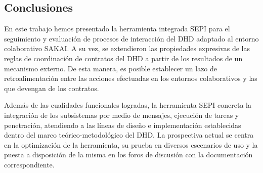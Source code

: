 \subsection{Conclusiones}


En este trabajo hemos presentado la herramienta integrada SEPI para el
seguimiento y evaluación de procesos de interacción del DHD adaptado al entorno
colaborativo SAKAI. A su vez, se extendieron las propiedades expresivas de las
reglas de coordinación de contratos del DHD a partir de los resultados de un
mecanismo externo. De esta manera, es posible establecer un lazo de
retroalimentación entre las acciones efectuadas en los entornos colaborativos y
las que devengan de los contratos.


Además de las cualidades funcionales logradas, la herramienta SEPI concreta la
integración de los subsistemas por medio de mensajes, ejecución de tareas y
penetración, atendiendo a las líneas de diseño e implementación establecidas
dentro del marco teórico-metodológico del DHD.
La prospectiva actual se centra en la optimización de la herramienta, su prueba
en diversos escenarios de uso y la puesta a disposición de la misma en los foros
de discusión con la documentación correspondiente.
